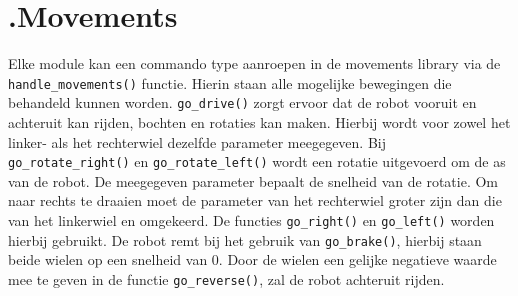 \documentclass[a4paper,10pt]{article}
\begin{document}
\section*{\label{movements}\thesection.\quad Movements}
Elke module kan een commando type aanroepen in de movements library via de \verb!handle_movements()! functie. Hierin staan alle mogelijke bewegingen die behandeld kunnen worden.  
\verb!go_drive()! zorgt ervoor dat de robot vooruit en achteruit kan rijden, bochten en rotaties kan maken. Hierbij wordt voor zowel het linker- als het rechterwiel dezelfde parameter meegegeven. 
Bij \verb!go_rotate_right()! en \verb!go_rotate_left()! wordt een rotatie uitgevoerd om de as van de robot. De meegegeven parameter bepaalt de snelheid van de rotatie. 
Om naar rechts te draaien moet de parameter van het rechterwiel groter zijn dan die van het linkerwiel en omgekeerd. De functies \verb!go_right()! en \verb!go_left()! worden hierbij gebruikt.
De robot remt bij het gebruik van \verb!go_brake()!, hierbij staan beide wielen op een snelheid van 0.
Door de wielen een gelijke negatieve waarde mee te geven in de functie \verb!go_reverse()!, zal de robot achteruit rijden.



\end{document}
